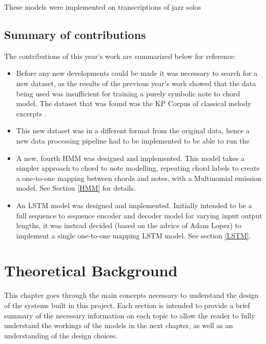 \documentclass[bsc,singlespacing,logo, parskip, deptreport]{infthesis}
\begin{document}
These models were implemented on transcriptions of jazz solos

\section{Summary of contributions}

The contributions of this year's work are summarized below for reference:

\begin{itemize}
  \item Before any new developments could be made it was necessary to search for a new dataset, as the results of the previous year's work showed that the data being used was insufficient for training a purely symbolic note to chord model. The dataset that was found was the KP Corpus of classical melody excerpts \cite{kostka2009tonal}.
  \item This new dataset was in a different format from the original data, hence a new data processing pipeline had to be implemented to be able to run the 
  \item A new, fourth HMM was designed and implemented. This model takes a simpler approach to chord to note modelling, repeating chord labels to create a one-to-one mapping between chords and notes, with a Multinomial emission model. See Section \ref{HMM} for details.
  \item An LSTM model was designed and implemented. Initially intended to be a full sequence to sequence encoder and decoder model for varying input output lengths, it was instead decided (based on the advice of Adam Lopez) to implement a single one-to-one mapping LSTM model. See section \ref{LSTM}.
\end{itemize}

\chapter{Theoretical Background}
This chapter goes through the main concepts necessary to understand the design of the systems built in this project. Each section is intended to provide a brief summary of the necessary information on each topic to allow the reader to fully understand the workings of the models in the next chapter, as well as an understanding of the design choices.
\end{document}
